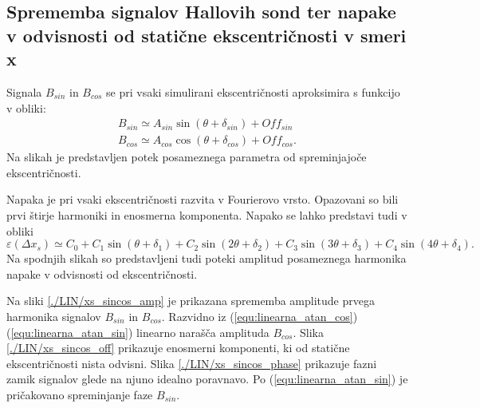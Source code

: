 \subsection{Sprememba signalov Hallovih sond ter napake v odvisnosti od statične ekscentričnosti v smeri x}

Signala $B_{sin}$ in $B_{cos}$ se pri vsaki simulirani ekscentričnosti aproksimira s funkcijo v obliki:
\begin{eqnarray}
B_{sin} \simeq A_{sin} \sin (\theta + \delta_{sin})+ Off_{sin}\\
B_{cos} \simeq A_{cos} \cos (\theta + \delta_{cos})+ Off_{cos}.
\end{eqnarray}
Na slikah je predstavljen potek posameznega parametra od spreminjajoče ekscentričnosti.

Napaka je pri vsaki ekscentričnosti razvita v Fourierovo vrsto. Opazovani so bili prvi štirje harmoniki in enosmerna komponenta. Napako se lahko predstavi tudi v obliki
\begin{equation}
\varepsilon (\Delta x_s) \simeq C_0 + C_1 \sin (\theta + \delta_1)
+ C_2 \sin (2 \theta + \delta_2)
+ C_3 \sin (3 \theta + \delta_3)
+ C_4 \sin (4 \theta + \delta_4).
\end{equation}
Na spodnjih slikah so predstavljeni tudi poteki amplitud posameznega harmonika napake v odvisnosti od ekscentričnosti.

Na sliki \ref{./LIN/xs_sincos_amp} je prikazana sprememba amplitude prvega harmonika signalov $B_{sin}$ in $B_{cos}$. Razvidno iz (\ref{equ:linearna_atan_cos})  (\ref{equ:linearna_atan_sin}) linearno narašča amplituda $B_{cos}$. Slika \ref{./LIN/xs_sincos_off} prikazuje enosmerni komponenti, ki od statične ekscentričnosti nista odvisni. Slika \ref{./LIN/xs_sincos_phase} prikazuje fazni zamik signalov glede na njuno idealno poravnavo. Po (\ref{equ:linearna_atan_sin}) je pričakovano spreminjanje faze $B_{sin}$.

